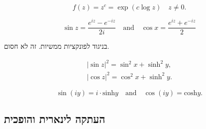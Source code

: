 \documentclass{tstextbook}
\begin{document}
\begin{definition}
$$f(z)=z^{c}=\exp(c\log z)\quad z\neq0.$$

\end{definition}
\begin{definition}
$$\sin z={\frac{e^{i z}-e^{-i z}}{2i}}\quad{\mathrm{and}}\quad\cos x={\frac{e^{i z}+e^{-i z}}{2}}$$

\end{definition}
בניגוד לפונקציות ממשיות. זה לא חסום.

\begin{proposition}
$$\begin{array}{l}{{|\sin z|^{2}=\sin^{2}x+\sinh^{2}y,}}\\ {{|\cos z|^{2}=\cos^{2}x+\sinh^{2}y.}}\end{array}$$

\end{proposition}
\begin{proposition}
$$\sin(i y)=i\cdot\mathrm{sinh}y\quad\mathrm{and}\quad\cos(i y)=\mathrm{cosh}y.$$

\end{proposition}
\subsection{העתקה לינארית והופכית}
\end{document}
